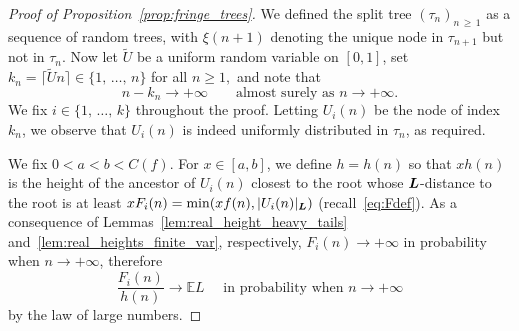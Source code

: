 \documentclass[AHL,Unicode,longabstracts,published]{cedram}
\newcommand{\bs}{\ensuremath{\boldsymbol}}
\newcommand{\bbE}{\mathbb{E}}
\begin{document}
\begin{proof}[Proof of Proposition~\ref{prop:fringe_trees}]
We defined the split tree $(\tau_n)_{n\,\geq\,1}$ as a sequence of random trees, with $\xi(n+1)$ denoting the unique node in $\tau_{n+1}$ but not in $\tau_n$. Now let $\widetilde U$ be a uniform random variable on $[0,1]$, set $k_n = \lceil \widetilde Un\rceil\in \{1,\,\ldots,\,n\}$ for all $n\geq 1,$ and note that
\begin{equation}\label{eq:n-kInfty}
n-k_n\to+\infty \qquad \text{almost surely as } n\to+\infty.
\end{equation}
We fix $i\in\{1,\,\dots,\,k\}$ throughout the proof. Letting $U_i(n)$ be the node of index $k_n$, we observe that $U_i(n)$ is indeed uniformly distributed in $\tau_n$, as required.


We fix $0<a< b<C(f)$. For $x\in[a,b]$, we define $h=h(n)$ so that $xh(n)$ is the height of the ancestor of $U_i(n)$ closest to the root whose $\bs L$-distance to the root is at least $xF_i(n)=\min(xf(n), |U_i(n)|_{\bs L})$ (recall~\eqref{eq:Fdef}). As a consequence of Lemmas~\ref{lem:real_height_heavy_tails} and~\ref{lem:real_heights_finite_var}, respectively, $F_i(n)\to+\infty$ in probability when $n\to+\infty$, therefore
\begin{equation}\label{eq:h_vs_f}
\frac{F_i(n)}{h(n)} \to \bbE L\quad\text{ in probability when }n\to+\infty
\end{equation}
by the law of large numbers.


\end{proof}
\end{document}
